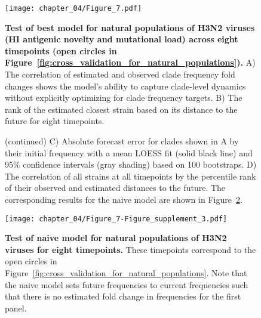 \begin{figure}
  \texttt{[image: chapter\_04/Figure\_7.pdf]}
  \caption[{Test of best model for natural populations of H3N2 viruses (HI antigenic novelty and mutational load) across eight timepoints (open circles in Figure~\ref{fig:cross_validation_for_natural_populations}).}]{
  {\bf Test of best model for natural populations of H3N2 viruses (HI antigenic novelty and mutational load) across eight timepoints (open circles in Figure~\ref{fig:cross_validation_for_natural_populations}).}
  A) The correlation of estimated and observed clade frequency fold changes shows the model's ability to capture clade-level dynamics without explicitly optimizing for clade frequency targets.
  B) The rank of the estimated closest strain based on its distance to the future for eight timepoints.
  }
  \label{fig:test_of_best_model_for_natural_populations}
\end{figure}

\begin{figure}\ContinuedFloat
  \caption[{}]{(continued)
    C) Absolute forecast error for clades shown in A by their initial frequency with a mean LOESS fit (solid black line) and 95\% confidence intervals (gray shading) based on 100 bootstraps.
    D) The correlation of all strains at all timepoints by the percentile rank of their observed and estimated distances to the future.
    The corresponding results for the naive model are shown in Figure~\ref{fig:test_of_naive_model_for_natural_populations}.
  }
\end{figure}

\begin{figure}
  \texttt{[image: chapter\_04/Figure\_7-Figure\_supplement\_3.pdf]}
  \caption[{Test of naive model for natural populations of H3N2 viruses for eight timepoints.}]{
    {\bf Test of naive model for natural populations of H3N2 viruses for eight timepoints.}
    These timepoints correspond to the open circles in Figure~\ref{fig:cross_validation_for_natural_populations}.
    Note that the naive model sets future frequencies to current frequencies such that there is no estimated fold change in frequencies for the first panel.
  }
  \label{fig:test_of_naive_model_for_natural_populations}
\end{figure}

